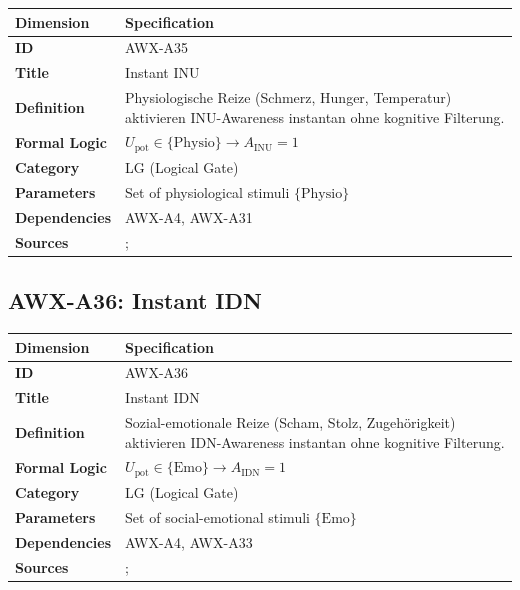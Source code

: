 \begin{table}[htbp]
\small
\begin{tabular}{p{3cm}p{11cm}}
\toprule
\textbf{Dimension} & \textbf{Specification} \\
\midrule
\textbf{ID} & AWX-A35 \\
\textbf{Title} & Instant INU \\
\textbf{Definition} & Physiologische Reize (Schmerz, Hunger, Temperatur) aktivieren INU-Awareness instantan ohne kognitive Filterung. \\
\textbf{Formal Logic} & $U_{\text{pot}} \in \{\text{Physio}\} \rightarrow A_{\text{INU}} = 1$ \\
\textbf{Category} & LG (Logical Gate) \\
\textbf{Parameters} & Set of physiological stimuli $\{\text{Physio}\}$ \\
\textbf{Dependencies} & AWX-A4, AWX-A31 \\
\textbf{Sources} & \citet{loewenstein2001risk}; \citet{PAP-kahneman2003maps} \\
\bottomrule
\end{tabular}
\end{table}


\subsection{AWX-A36: Instant IDN}

\begin{table}[htbp]
\small
\begin{tabular}{p{3cm}p{11cm}}
\toprule
\textbf{Dimension} & \textbf{Specification} \\
\midrule
\textbf{ID} & AWX-A36 \\
\textbf{Title} & Instant IDN \\
\textbf{Definition} & Sozial-emotionale Reize (Scham, Stolz, Zugehörigkeit) aktivieren IDN-Awareness instantan ohne kognitive Filterung. \\
\textbf{Formal Logic} & $U_{\text{pot}} \in \{\text{Emo}\} \rightarrow A_{\text{IDN}} = 1$ \\
\textbf{Category} & LG (Logical Gate) \\
\textbf{Parameters} & Set of social-emotional stimuli $\{\text{Emo}\}$ \\
\textbf{Dependencies} & AWX-A4, AWX-A33 \\
\textbf{Sources} & \citet{PAP-akerlof2000identity}; \citet{elster1998emotions} \\
\bottomrule
\end{tabular}
\end{table}

